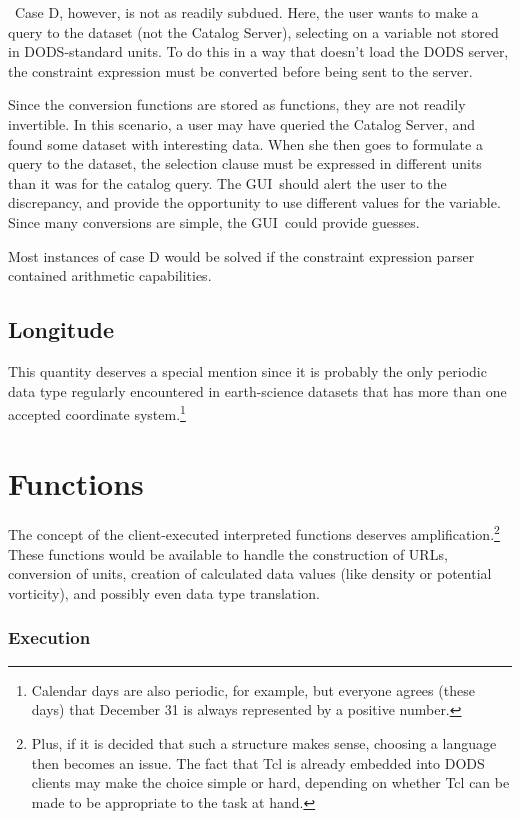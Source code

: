 \documentclass[10pt]{report}
\newcommand{\cs}{Catalog Server}
\newcommand{\gui}{GUI}
\begin{document}
\cbstart\ 
Case D, however, is not as readily subdued.  Here, the user wants to
make a query to the dataset (not the \cs ), selecting on a variable
not stored in DODS-standard units.  To do this in a way that doesn't
load the DODS server, the constraint expression must be converted
before being sent to the server.  

 Since the conversion functions are
stored as functions, they are not readily invertible.  In this
scenario, a user may have queried the \cs , and found some dataset
with interesting data.  When she then goes to formulate a query to the
dataset, the selection clause must be expressed in different units
than it was for the catalog query.  The \gui\ should alert the user to
the discrepancy, and provide the opportunity to use different values
for the variable.  Since many conversions are simple, the \gui\ could
provide guesses.
\cbend

Most instances of case D would be solved if the constraint expression
parser contained arithmetic capabilities.  

\subsection{Longitude}
\label{sec:longitude}

This quantity deserves a special mention since it is probably the only
periodic data type regularly encountered in earth-science datasets
that has more than one accepted coordinate system.\footnote{Calendar
  days are also periodic, for example, but everyone agrees (these
  days) that December 31 is always represented by a positive number.}

\section{Functions}
\label{sec:functions}

The concept of the client-executed interpreted functions deserves
amplification.\footnote{Plus, if it is decided that such a structure
  makes sense, choosing a language then becomes an issue.  The fact
  that Tcl is already embedded into DODS clients may make the choice
  simple or hard, depending on whether Tcl can be made to be
  appropriate to the task at hand.}  These functions would be
available to handle the construction of URLs, conversion of units,
creation of calculated data values (like density or potential
vorticity), and possibly even data type translation.

\subsubsection{Execution}
\end{document}
